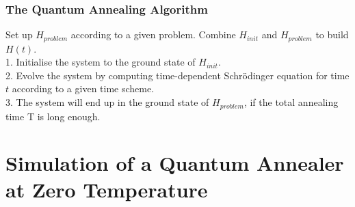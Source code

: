 \documentclass{beamer}
\begin{document}
\begin{frame}
	\frametitle{The Quantum Annealing Algorithm}
	\begin{tcolorbox}[title=Quantum Annealing Algorithm]
		Set up $H_{problem}$ according to a given problem. Combine $H_{init}$ and $H_{problem}$ to build $H(t)$. \\
		
		1. Initialise the system to the ground state of $H_{init}$.\\ %
		
		
		
		2. Evolve the system by computing time-dependent Schrödinger equation for time $t$ according to a given time scheme. \\
		
		3. The system will end up in the ground state of $H_{problem}$, if the total annealing time T is long enough.\\
		
	\end{tcolorbox} 
\end{frame}


\section{Simulation of a Quantum Annealer at Zero Temperature}
\end{document}

